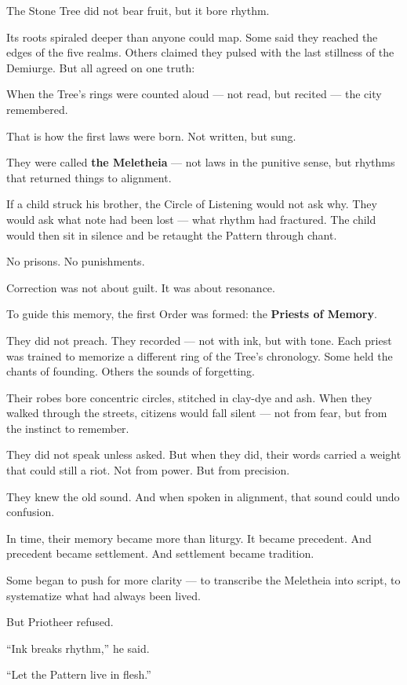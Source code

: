 \documentclass[12pt]{article}
\begin{document}
The Stone Tree did not bear fruit, but it bore rhythm.

Its roots spiraled deeper than anyone could map.  
Some said they reached the edges of the five realms.  
Others claimed they pulsed with the last stillness of the Demiurge.  
But all agreed on one truth:

When the Tree’s rings were counted aloud — not read, but recited —  
the city remembered.

That is how the first laws were born.  
Not written, but sung.

They were called \textbf{the Meletheia} — not laws in the punitive sense,  
but rhythms that returned things to alignment.

If a child struck his brother, the Circle of Listening would not ask why.  
They would ask what note had been lost — what rhythm had fractured.  
The child would then sit in silence and be retaught the Pattern through chant.

No prisons.  
No punishments.

Correction was not about guilt.  
It was about resonance.

To guide this memory, the first Order was formed:  
the \textbf{Priests of Memory}.

They did not preach.  
They recorded — not with ink, but with tone.  
Each priest was trained to memorize a different ring of the Tree’s chronology.  
Some held the chants of founding.  
Others the sounds of forgetting.

Their robes bore concentric circles, stitched in clay-dye and ash.  
When they walked through the streets, citizens would fall silent —  
not from fear,  
but from the instinct to remember.

They did not speak unless asked.  
But when they did, their words carried a weight that could still a riot.  
Not from power.  
But from precision.

They knew the old sound.  
And when spoken in alignment, that sound could undo confusion.

In time, their memory became more than liturgy.  
It became precedent.  
And precedent became settlement.  
And settlement became tradition.

Some began to push for more clarity —  
to transcribe the Meletheia into script,  
to systematize what had always been lived.

But Priotheer refused.

“Ink breaks rhythm,” he said.

“Let the Pattern live in flesh.”
\end{document}
